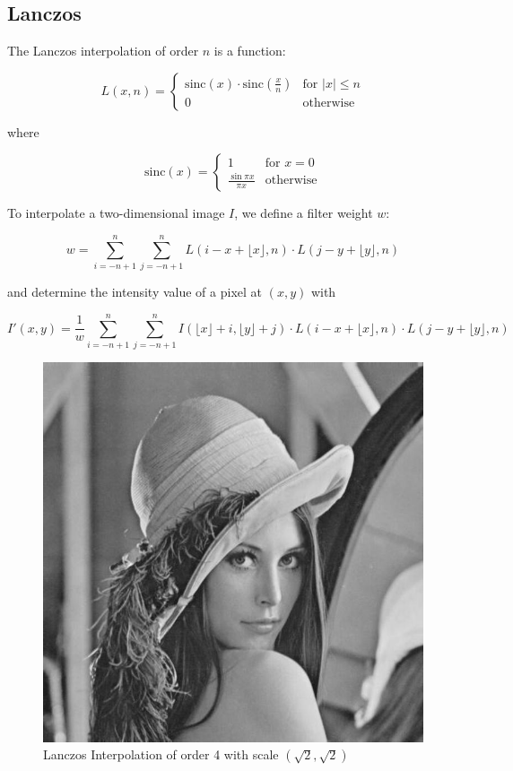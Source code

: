 \subsection{Lanczos} \label{subsec:lanczos4}

The Lanczos interpolation of order $n$ is a function:

\[L(x, n) =   \begin{cases}
    \text{sinc}(x)\cdot\text{sinc}(\frac{x}{n}) & \text{for } |x|\leq n \\
    0 & \text{otherwise}
  \end{cases}\]

where 

\[\text{sinc}(x) =   \begin{cases}
    1 & \text{for } x=0 \\
    \frac{\sin{\pi x}}{\pi x} & \text{otherwise}
  \end{cases}\]
  
To interpolate a two-dimensional image $I$, we define a filter weight $w$:

\[w = \sum_{i=-n+1}^n\sum_{j=-n+1}^n L(i-x + \lfloor x\rfloor, n)\cdot L(j - y + \lfloor y\rfloor, n)\]

and determine the intensity value of a pixel at $(x, y)$ with 

\[I'(x,y)=\frac{1}{w}\sum_{i=-n+1}^n\sum_{j=-n+1}^n I(\lfloor x\rfloor + i, \lfloor y\rfloor + j)\cdot L(i-x + \lfloor x\rfloor, n)\cdot L(j-y + \lfloor y\rfloor, n)\]

\begin{figure}[H]
    \centering
    \includegraphics[scale=0.5]{images/lenna-lanczos4.jpg}
    \caption{Lanczos Interpolation of order 4 with scale $(\sqrt{2}, \sqrt{2})$}
    \label{fig:lenna-lanczos4}
\end{figure}